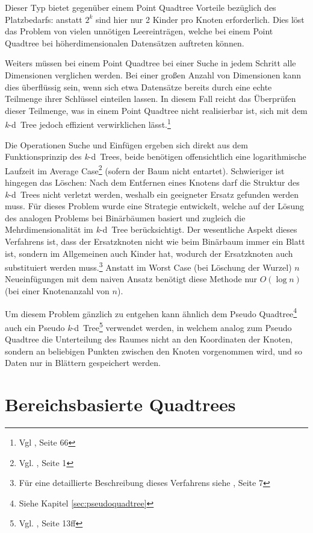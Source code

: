 \documentclass[%
			paper=a4,%
			DIV12,
			liststotoc,
			bibtotoc,
			draft=false,%
			titlepage,
			numbers=noendperiod
			]{scrartcl}
\newcommand{\zit}[3]{#1 \cite{#2}, #3}
\newcommand{\footzit}[3]{\footnote{\zit{#1}{#2}{#3}}}
\newcommand{\kd}{\mbox{\textit{k}-d}}
\begin{document}
Dieser Typ bietet gegenüber einem Point Quadtree Vorteile bezüglich des Platzbedarfs:
anstatt $2^k$ sind hier nur 2 Kinder pro Knoten erforderlich.
Dies löst das Problem von vielen unnötigen Leereinträgen, welche bei einem Point Quadtree bei höherdimensionalen Datensätzen auftreten können.

Weiters müssen bei einem Point Quadtree bei einer Suche in jedem Schritt alle Dimensionen verglichen werden.
Bei einer großen Anzahl von Dimensionen kann dies überflüssig sein, wenn sich etwa Datensätze bereits durch eine echte Teilmenge ihrer Schlüssel einteilen lassen.
In diesem Fall reicht das Überprüfen dieser Teilmenge,
was in einem Point Quadtree nicht realisierbar ist, sich mit dem \kd\ Tree jedoch effizient verwirklichen lässt.\footzit{Vgl}{Samet90}{Seite 66}

Die Operationen Suche und Einfügen ergeben sich direkt aus dem Funktionsprinzip des \kd\ Trees, beide benötigen offensichtlich eine logarithmische Laufzeit im Average Case\footzit{Vgl.}{Bentley:1975}{Seite 1} (sofern der Baum nicht entartet).
Schwieriger ist hingegen das Löschen:
Nach dem Entfernen eines Knotens darf die Struktur des \kd\ Trees nicht verletzt werden, weshalb ein geeigneter Ersatz gefunden werden muss.
Für dieses Problem wurde eine Strategie entwickelt, welche auf der Lösung des analogen Problems bei Binärbäumen basiert und zugleich die Mehrdimensionalität im \kd\ Tree berücksichtigt.
Der wesentliche Aspekt dieses Verfahrens ist, dass der Ersatzknoten nicht wie beim Binärbaum immer ein Blatt ist, sondern im Allgemeinen auch Kinder hat, wodurch der Ersatzknoten auch substituiert werden muss.\footzit{Für eine detaillierte Beschreibung dieses Verfahrens siehe}{Bentley:1975}{Seite 7} 
Anstatt im Worst Case (bei Löschung der Wurzel) $n$ Neueinfügungen mit dem naiven Ansatz benötigt diese Methode nur $O(\log n)$ (bei einer Knotenanzahl von $n$).

Um diesem Problem gänzlich zu entgehen kann ähnlich dem Pseudo Quadtree\footnote{Siehe Kapitel \ref{sec:pseudoquadtree}} auch ein Pseudo \kd\ Tree\footzit{Vgl.}{DBLP:journals/acta/OvermarsL82}{Seite 13ff} verwendet werden,
in welchem analog zum Pseudo Quadtree die Unterteilung des Raumes nicht an den Koordinaten der Knoten, sondern an beliebigen Punkten zwischen den Knoten vorgenommen wird, und so Daten nur in Blättern gespeichert werden.



\section{Bereichsbasierte Quadtrees}
\end{document}
